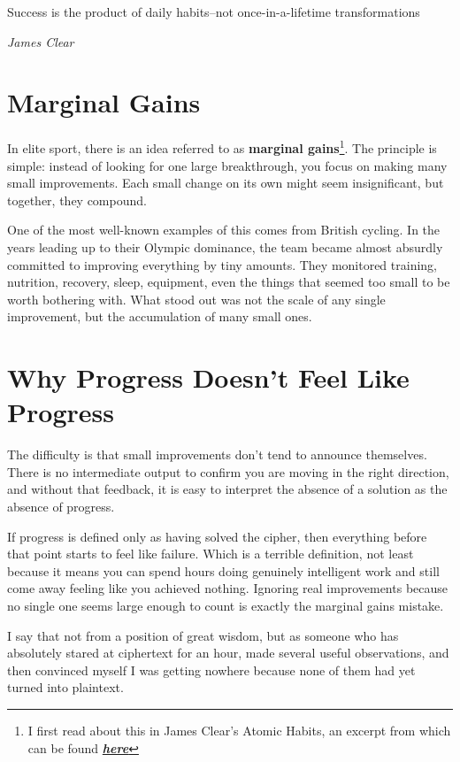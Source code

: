 \epigraph{Success is the product of daily habits--not once-in-a-lifetime transformations}
{\textit{James Clear}}


\section{Marginal Gains}

In elite sport, there is an idea referred to as \textbf{marginal gains}\footnote{I first read about this in James Clear's Atomic Habits, an excerpt from which can be found \textbf{\href{https://jamesclear.com/marginal-gains}{\textit{here}}}}. The principle is simple: instead of looking for one large breakthrough, you focus on making many small improvements. Each small change on its own might seem insignificant, but together, they compound. 

One of the most well-known examples of this comes from British cycling. In the years leading up to their Olympic dominance, the team became almost absurdly committed to improving everything by tiny amounts. They monitored training, nutrition, recovery, sleep, equipment, even the things that seemed too small to be worth bothering with. What stood out was not the scale of any single improvement, but the accumulation of many small ones. 


\section{Why Progress Doesn’t Feel Like Progress} 

The difficulty is that small improvements don't tend to announce themselves. There is no intermediate output to confirm you are moving in the right direction, and without that feedback, it is easy to interpret the absence of a solution as the absence of progress.

If progress is defined only as having solved the cipher, then everything before that point starts to feel like failure. Which is a terrible definition, not least because it means you can spend hours doing genuinely intelligent work and still come away feeling like you achieved nothing. Ignoring real improvements because no single one seems large enough to count is exactly the marginal gains mistake. 

I say that not from a position of great wisdom, but as someone who has absolutely stared at ciphertext for an hour, made several useful observations, and then convinced myself I was getting nowhere because none of them had yet turned into plaintext.


